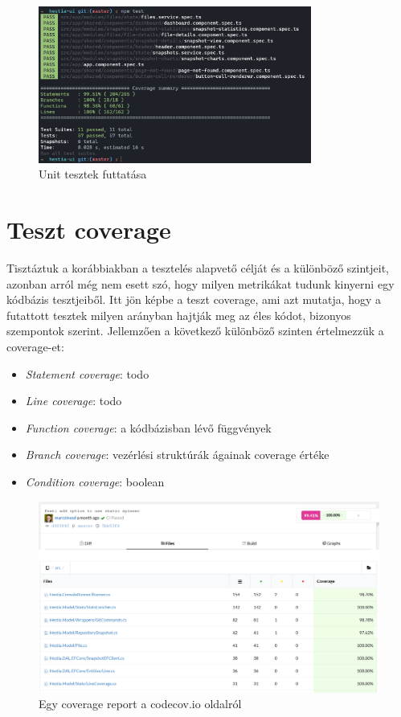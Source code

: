 \begin{figure}[H]
    \centering
    \includegraphics[width=0.8\textwidth]{images/testRun.png}
    \caption{Unit tesztek futtatása}
    \label{fig:unit-test-run-example}
\end{figure}

\section{Teszt coverage}

Tisztáztuk a korábbiakban a tesztelés alapvető célját és a különböző szintjeit, azonban arról még nem esett szó, hogy milyen metrikákat tudunk kinyerni egy kódbázis tesztjeiből. Itt jön képbe a teszt coverage, ami azt mutatja, hogy a futattott tesztek milyen arányban hajtják meg az éles kódot, bizonyos szempontok szerint. Jellemzően a következő különböző szinten értelmezzük a coverage-et:
\begin{itemize}
    \item \textit{Statement coverage}: todo
    \item \textit{Line coverage}: todo
    \item \textit{Function coverage}: a kódbázisban lévő függvények
    \item \textit{Branch coverage}: vezérlési struktúrák ágainak coverage értéke
    \item \textit{Condition coverage}: boolean
\end{itemize}

\begin{figure}[H]
    \centering
    \includegraphics[width=1\textwidth]{images/codecov-report.png}
    \caption{Egy coverage report a codecov.io oldalról}
    \label{fig:codecov-example}
\end{figure}

